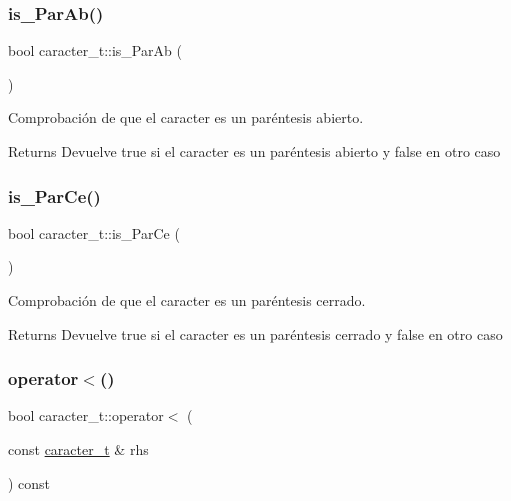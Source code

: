 \subsubsection{\texorpdfstring{is\+\_\+\+Par\+Ab()}{is\_ParAb()}}
{\footnotesize\ttfamily bool caracter\+\_\+t\+::is\+\_\+\+Par\+Ab (\begin{DoxyParamCaption}{ }\end{DoxyParamCaption})}



Comprobación de que el caracter es un paréntesis abierto. 

\begin{DoxyReturn}{Returns}
Devuelve true si el caracter es un paréntesis abierto y false en otro caso 
\end{DoxyReturn}
\mbox{\label{classcaracter__t_af29d91fd4e785878f4654e5580761160}} 
\subsubsection{\texorpdfstring{is\+\_\+\+Par\+Ce()}{is\_ParCe()}}
{\footnotesize\ttfamily bool caracter\+\_\+t\+::is\+\_\+\+Par\+Ce (\begin{DoxyParamCaption}{ }\end{DoxyParamCaption})}



Comprobación de que el caracter es un paréntesis cerrado. 

\begin{DoxyReturn}{Returns}
Devuelve true si el caracter es un paréntesis cerrado y false en otro caso 
\end{DoxyReturn}
\mbox{\label{classcaracter__t_a37981f4c8bed422fc7fdfb88acdc9e33}} 
\subsubsection{\texorpdfstring{operator$<$()}{operator<()}}
{\footnotesize\ttfamily bool caracter\+\_\+t\+::operator$<$ (\begin{DoxyParamCaption}\item[{const \hyperlink{classcaracter__t}{caracter\+\_\+t} \&}]{rhs }\end{DoxyParamCaption}) const}



